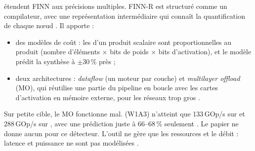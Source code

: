 \citet{arxiv-1809.04570-finn-r-end-end-deep} étendent FINN aux précisions multiples. FINN-R
est structuré comme un compilateur, avec une représentation intermédiaire qui connaît la
quantification de chaque nœud . Il apporte :
\begin{itemize}
  \item des modèles de coût : les  d'un produit scalaire sont proportionnelles au
    produit (nombre d'éléments $\times$ bits de poids $\times$ bits d'activation), et le
    modèle prédit la synthèse à $\pm$30\,\% près  ;
  \item deux architectures : \emph{dataflow} (un moteur par couche) et \emph{multilayer
    offload} (MO), qui réutilise une partie du pipeline en boucle avec les cartes
    d'activation en mémoire externe, pour les réseaux trop gros .
\end{itemize}
Sur petite cible, le MO fonctionne mal.  (W1A3) n'atteint que 133\,GOp/s sur
 et 288\,GOp/s sur , avec une prédiction juste à 66--68\,\% seulement
. Le papier ne donne aucun  pour ce détecteur. L'outil ne gère que les
ressources et le débit : latence et puissance ne sont pas modélisées .

